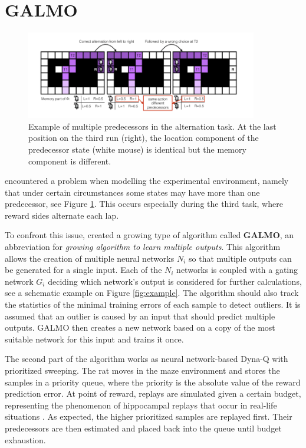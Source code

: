 \documentclass[a4paper]{article}
\begin{document}
	\section{GALMO}
	\begin{figure}[b]
		\centering
		\includegraphics[angle=0,width=0.9\textwidth]{./figs/MultiplePredecessors.png}
		\caption{\label{fig:predecessors}Example of multiple predecessors in the alternation task. At the last position on the third run (right), the location component of the predecessor state (white mouse) is identical but the memory component is different. \citep{NeuralDynaQ}}
	\end{figure}
	\label{sec:galmo}
	\citet{NeuralDynaQ} encountered a problem when modelling the experimental environment, namely that under certain circumstances some states may have more than one predecessor, see Figure \ref{fig:predecessors}. This occurs especially during the third task, where reward sides alternate each lap.
	\par To confront this issue, \citet{NeuralDynaQ} created a growing type of algorithm called \textbf{GALMO}, an abbreviation for \textit{growing algorithm to learn multiple outputs}. This algorithm allows the creation of multiple neural networks $N_i$ so that multiple outputs can be generated for a single input. Each of the $N_i$ networks is coupled with a gating network $G_i$ deciding which network's output is considered for further calculations, see a schematic example on Figure \ref{fig:example}. The algorithm should also track the statistics of the minimal training errors of each sample to detect outliers. It is assumed that an outlier is caused by an input that should predict multiple outputs. GALMO then creates a new network based on a copy of the most suitable network for this input and trains it once. 
	\par The second part of the algorithm works as neural network-based Dyna-Q with prioritized sweeping. The rat moves in the maze environment and stores the samples in a priority queue, where the priority is the absolute value of the reward prediction error. At point of reward, replays are simulated given a certain budget, representing the phenomenon of hippocampal replays that occur in real-life situations \citep{OKEEFE1971171}. As expected, the higher prioritized samples are replayed first. Their predecessors are then estimated and placed back into the queue until budget exhaustion.
\end{document}
